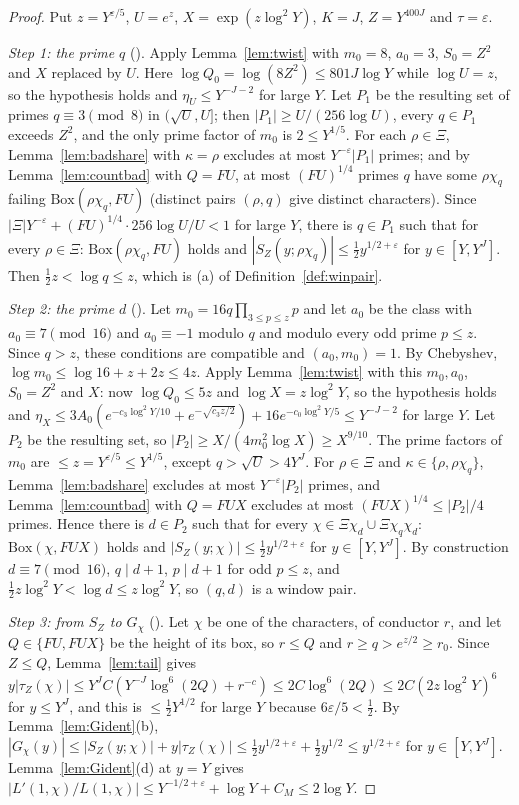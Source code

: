 \documentclass[11pt]{amsart}
\newcommand{\eps}{\varepsilon}
\theoremstyle{plain}
\theoremstyle{definition}
\numberwithin{equation}{section}
\begin{document}
\begin{proof}
Put $z=Y^{\eps/5}$, $U=e^z$, $X=\exp(z\log^2Y)$, $K=J$, $Z=Y^{400J}$ and $\tau=\eps$.

\emph{Step 1: the prime $q$} (). Apply Lemma~\ref{lem:twist} with $m_0=8$, $a_0=3$,
$S_0=Z^2$ and $X$ replaced by $U$. Here $\log Q_0=\log(8Z^2)\le801J\log Y$ while $\log U=z$, so
the hypothesis holds and $\eta_U\le Y^{-J-2}$ for large $Y$. Let $P_1$ be the resulting set of primes
$q\equiv3\pmod8$ in $(\sqrt U,U]$; then $|P_1|\ge U/(256\log U)$, every $q\in P_1$ exceeds $Z^2$,
and the only prime factor of $m_0$ is $2\le Y^{1/5}$. For each $\rho\in\Xi$, Lemma~\ref{lem:badshare}
with $\kappa=\rho$ excludes at most $Y^{-\eps}|P_1|$ primes; and by Lemma~\ref{lem:countbad} with
$Q=FU$, at most $(FU)^{1/4}$ primes $q$ have some $\rho\chi_q$ failing $\mathrm{Box}(\rho\chi_q,FU)$
(distinct pairs $(\rho,q)$ give distinct characters). Since $|\Xi|Y^{-\eps}+(FU)^{1/4}\cdot256\log U/U<1$
for large $Y$, there is $q\in P_1$ such that for every $\rho\in\Xi$: $\mathrm{Box}(\rho\chi_q,FU)$
holds and $|S_Z(y;\rho\chi_q)|\le\frac12y^{1/2+\eps}$ for $y\in[Y,Y^J]$. Then
$\frac12z<\log q\le z$, which is (a) of Definition~\ref{def:winpair}.

\emph{Step 2: the prime $d$} (). Let $m_0=16q\prod_{3\le p\le z}p$ and let $a_0$ be the
class with $a_0\equiv7\pmod{16}$ and $a_0\equiv-1$ modulo $q$ and modulo every odd prime $p\le z$.
Since $q>z$, these conditions are compatible and $(a_0,m_0)=1$. By Chebyshev,
$\log m_0\le\log16+z+2z\le4z$. Apply Lemma~\ref{lem:twist} with this $m_0,a_0$, $S_0=Z^2$ and $X$:
now $\log Q_0\le5z$ and $\log X=z\log^2Y$, so the hypothesis holds and
$\eta_X\le3A_0(e^{-c_3\log^2Y/10}+e^{-\sqrt{c_3z/2}})+16e^{-c_0\log^2Y/5}\le Y^{-J-2}$ for large $Y$.
Let $P_2$ be the resulting set, so $|P_2|\ge X/(4m_0^2\log X)\ge X^{9/10}$. The prime factors of $m_0$
are $\le z=Y^{\eps/5}\le Y^{1/5}$, except $q>\sqrt U>4Y^J$. For $\rho\in\Xi$ and $\kappa\in\{\rho,\rho\chi_q\}$,
Lemma~\ref{lem:badshare} excludes at most $Y^{-\eps}|P_2|$ primes, and Lemma~\ref{lem:countbad} with
$Q=FUX$ excludes at most $(FUX)^{1/4}\le|P_2|/4$ primes. Hence there is $d\in P_2$ such that for
every $\chi\in\Xi\chi_d\cup\Xi\chi_q\chi_d$: $\mathrm{Box}(\chi,FUX)$ holds and
$|S_Z(y;\chi)|\le\frac12y^{1/2+\eps}$ for $y\in[Y,Y^J]$. By construction $d\equiv7\pmod{16}$,
$q\mid d+1$, $p\mid d+1$ for odd $p\le z$, and $\frac12z\log^2Y<\log d\le z\log^2Y$, so $(q,d)$ is a
window pair.

\emph{Step 3: from $S_Z$ to $G_\chi$} (). Let $\chi$ be one of the characters, of
conductor $r$, and let $Q\in\{FU,FUX\}$ be the height of its box, so $r\le Q$ and $r\ge q>e^{z/2}\ge r_0$.
Since $Z\le Q$, Lemma~\ref{lem:tail} gives
$y|\tau_Z(\chi)|\le Y^JC(Y^{-J}\log^6(2Q)+r^{-c})\le2C\log^6(2Q)\le2C(2z\log^2Y)^6$ for
$y\le Y^J$, and this is $\le\frac12Y^{1/2}$ for large $Y$ because $6\eps/5<\frac12$. By
Lemma~\ref{lem:Gident}(b), $|G_\chi(y)|\le|S_Z(y;\chi)|+y|\tau_Z(\chi)|\le\frac12y^{1/2+\eps}+\frac12y^{1/2}\le y^{1/2+\eps}$
for $y\in[Y,Y^J]$. Lemma~\ref{lem:Gident}(d) at $y=Y$ gives
$|L'(1,\chi)/L(1,\chi)|\le Y^{-1/2+\eps}+\log Y+C_M\le2\log Y$.
\end{proof}
\end{document}

